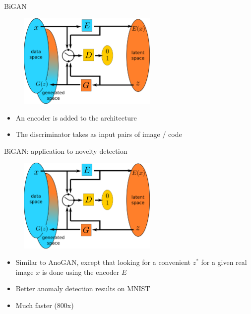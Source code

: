 \documentclass[xcolor=pdftex,dvipsnames,table,mathserif]{beamer}
\begin{document}
\begin{frame}{BiGAN}

  \begin{figure}[ht]
    \centering
    \includegraphics[width=0.6\textwidth]{bigan}
  \end{figure}

  \begin{itemize}
  \item An encoder is added to the architecture
  \item The discriminator takes as input pairs of image / code
  \end{itemize}


\end{frame}

\begin{frame}{BiGAN: application to novelty detection \cite{zenati_efficient_2018}}

  \begin{figure}[ht]
    \centering
    \includegraphics[width=0.6\textwidth]{bigan}
  \end{figure}

  \begin{itemize}
  \item Similar to AnoGAN, except that looking for a convenient $z^*$ for a given real image $x$ is done using the encoder $E$
  \item Better anomaly detection results on MNIST
  \item Much faster (800x)
  \end{itemize}


\end{frame}
\end{document}
